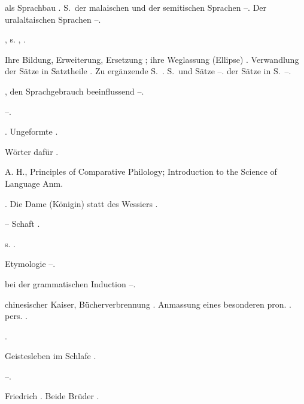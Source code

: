 \begin{register}
 als Sprachbau \pageref{sp.81}. S.~der malaischen und der semitischen Sprachen \pageref{sp.413}–\pageref{sp.414}. Der uralaltaischen Sprachen \pageref{sp.418}–\pageref{sp.419}.

, s. , .

 Ihre Bildung, Erweiterung, Ersetzung \pageref{sp.101}; ihre Weglassung (Ellipse) \pageref{sp.101}. Verwandlung der Sätze in Satztheile \pageref{sp.104}. Zu ergänzende S.~\pageref{sp.366}. S.~und Sätze \pageref{sp.451}–\pageref{sp.456}.  der Sätze in S.~\pageref{sp.463}–\pageref{sp.470}.

, den Sprachgebrauch beeinflussend \pageref{sp.245}–\pageref{sp.250}.

 \pageref{sp.103}–\pageref{sp.104}.

 \pageref{sp.81}. Ungeformte \pageref{sp.345}.

 Wörter dafür \pageref{sp.153}.

 A. H., Principles of Comparative Philology; Introduction to the Science of Language \pageref{sp.52} Anm.

. Die Dame (Königin) statt des Wessiers \pageref{sp.268}.

 – Schaft \pageref{sp.267}.

 s. .


 Etymologie \pageref{sp.179}–\pageref{sp.181}.

 bei der grammatischen Induction \pageref{sp.92}–\pageref{sp.93}.

 chinesischer Kaiser, Bücherverbrennung \pageref{sp.19}. Anmassung eines besonderen pron. \pageref{sp.1}. pers. \pageref{sp.230}.

 \pageref{sp.282}.

 Geistesleben im Schlafe \pageref{sp.275}.


 \pageref{sp.234}–\pageref{sp.235}.

 Friedrich \pageref{sp.26}. Beide Brüder \pageref{sp.31}.


\end{register}
